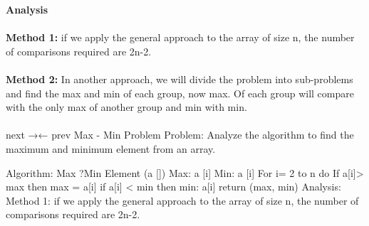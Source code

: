 \documentclass{article}
\begin{document}
\textbf{\huge{Analysis}}\\
\\
\textbf{Method 1:} if we apply the general approach to the array of size n, the number of comparisons required are 2n-2.\\
\\
\textbf{Method 2:} In another approach, we will divide the problem into sub-problems and find the max and min of each group, now max. Of each group will compare with the only max of another group and min with min.\\
\\

next →← prev
Max - Min Problem
Problem: Analyze the algorithm to find the maximum and minimum element from an array.

Algorithm: Max ?Min Element (a [])
Max:  a [i]
Min:   a [i]
For i= 2 to n do
If a[i]> max then
max = a[i]
if a[i] < min then
min: a[i]
return (max, min)
Analysis:
Method 1: if we apply the general approach to the array of size n, the number of comparisons required are 2n-2.
\end{document}
